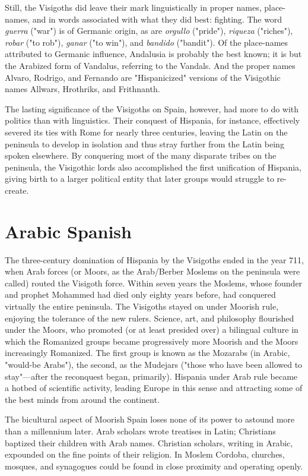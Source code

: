 Still, the Visigoths did leave their mark linguistically in proper
names, place-names, and in words associated with what they did best:
fighting. The word \emph{guerra} ("war") is of Germanic origin, as are \emph{orgullo}
("pride"), \emph{riqueza} ("riches"), \emph{robar} ("to rob"), \emph{ganar} ("to win"), and
\emph{bandido} ("bandit"). Of the place-names attributed to Germanic influence, Andalusia is probably the best known; it is but the Arabized
form of Vandalus, referring to the Vandals. And the proper names Alvaro, Rodrigo, and Fernando are "Hispanicized" versions of the Visigothic names Allwars, Hrothriks, and Frithnanth.

The lasting significance of the Visigoths on Spain, however,
had more to do with politics than with linguistics. Their conquest of
Hispania, for instance, effectively severed its ties with Rome for nearly
three centuries, leaving the Latin on the peninsula to develop in isolation and thus stray further from the Latin being spoken elsewhere. By
conquering most of the many disparate tribes on the peninsula, the
Visigothic lords also accomplished the first unification of Hispania,
giving birth to a larger political entity that later groups would struggle
to re-create.

\section{Arabic Spanish}

The three-century domination of Hispania by the Visigoths
ended in the year 711, when Arab forces (or Moors, as the Arab/Berber
Moslems on the peninsula were called) routed the Visigoth force.
Within seven years the Moslems, whose founder and prophet Mohammed had died only eighty years before, had conquered virtually the entire peninsula. The Visigoths stayed on under Moorish rule, enjoying
the tolerance of the new rulers. Science, art, and philosophy flourished
under the Moors, who promoted (or at least presided over) a bilingual
culture in which the Romanized groups became progressively more
Moorish and the Moors increasingly Romanized. The first group is
known as the Mozarabs (in Arabic, "would-be Arabs"), the second, as
the Mudejars ("those who have been allowed to stay"---after the reconquest began, primarily). Hispania under Arab rule became a hotbed of
scientific activity, leading Europe in this sense and attracting some of
the best minds from around the continent.

The bicultural aspect of Moorish Spain loses none of its power
to astound more than a millennium later. Arab scholars wrote treatises
in Latin; Christians baptized their children with Arab names. Christian scholars, writing in Arabic, expounded on the fine points of their
religion. In Moslem Cordoba, churches, mosques, and synagogues
could be found in close proximity and operating openly.

